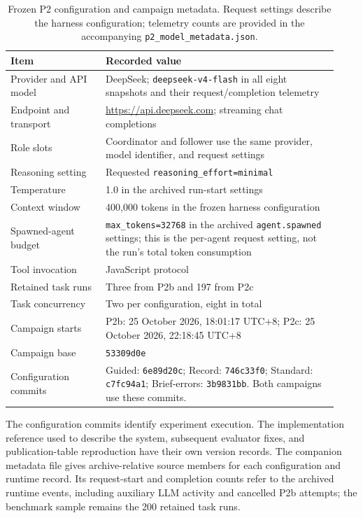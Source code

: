 \begin{table}[htbp]
\centering
\small
\caption{Frozen P2 configuration and campaign metadata. Request settings describe the harness configuration; telemetry counts are provided in the accompanying \texttt{p2\_model\_metadata.json}.}
\label{tab:si-p2-model-metadata}
\begin{tabular}{p{0.27\linewidth}p{0.66\linewidth}}
\toprule
Item & Recorded value \\
\midrule
Provider and API model & DeepSeek; \texttt{deepseek-v4-flash} in all eight snapshots and their request/completion telemetry \\
Endpoint and transport & \url{https://api.deepseek.com}; streaming chat completions \\
Role slots & Coordinator and follower use the same provider, model identifier, and request settings \\
Reasoning setting & Requested \texttt{reasoning\_effort=minimal} \\
Temperature & 1.0 in the archived run-start settings \\
Context window & 400,000 tokens in the frozen harness configuration \\
Spawned-agent budget & \texttt{max\_tokens=32768} in the archived \texttt{agent.spawned} settings; this is the per-agent request setting, not the run's total token consumption \\
Tool invocation & JavaScript protocol \\
Retained task runs & Three from P2b and 197 from P2c \\
Task concurrency & Two per configuration, eight in total \\
Campaign starts & P2b: 25 October 2026, 18:01:17 UTC+8; P2c: 25 October 2026, 22:18:45 UTC+8 \\
Campaign base & \texttt{53309d0e} \\
Configuration commits & Guided: \texttt{6e89d20c}; Record: \texttt{746c33f0}; Standard: \texttt{c7fc94a1}; Brief-errors: \texttt{3b9831bb}. Both campaigns use these commits. \\
\bottomrule
\end{tabular}
\end{table}

The configuration commits identify experiment execution. The implementation reference used to describe the system, subsequent evaluator fixes, and publication-table reproduction have their own version records. The companion metadata file gives archive-relative source members for each configuration and runtime record. Its request-start and completion counts refer to the archived runtime events, including auxiliary LLM activity and cancelled P2b attempts; the benchmark sample remains the 200 retained task runs.

